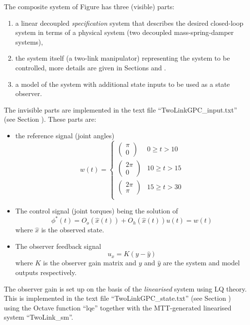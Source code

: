 The composite system of Figure  has three
(visible) parts:
\begin{enumerate}
\item a linear decoupled \emph{specification} system that describes the desired
  closed-loop system in terms of a physical system (two decoupled
  mass-spring-damper systems),
\item the system itself (a two-link manipulator) representing the
  system to be controlled, more details are given in Sections
   and .
\item a model of the system with additional state inputs to be used as
  a state observer.
\end{enumerate}
The invisible parts are implemented in the text file
``TwoLinkGPC\_input.txt'' (see Section ).
These parts are:
\begin{itemize}
\item the reference signal (joint angles)
  \begin{equation}
    w(t) = 
    \begin{cases}
      \begin{pmatrix}
        \pi \\
        0
      \end{pmatrix} & 0 \ge t > 10 \\
      \begin{pmatrix}
        2\pi \\
        0
      \end{pmatrix} & 10 \ge t > 15 \\
      \begin{pmatrix}
        2\pi \\
        \pi
      \end{pmatrix} & 15 \ge t > 30 \\
    \end{cases}
  \end{equation}
\item The control signal (joint torques) being the solution of 
  \begin{equation}
    \phi^*(t) = O_o(\hat x(t)) + O_h(\hat x(t)) u(t) = w(t)
  \end{equation}
where $\hat x$ is the observed state.
\item The observer feedback signal
  \begin{equation}
    u_x = K ( y - \hat y)
  \end{equation}
where $K$ is the observer gain matrix and $y$ and $\hat y$ are the
system and model outputs respectively.
\end{itemize}
The observer gain is set up on the basis of the \emph{linearised}
system using LQ theory. This is implemented in the text file
``TwoLinkGPC\_state.txt'' (see Section )
using the Octave function ``lqe'' together with the MTT-generated
linearised system ``TwoLink\_sm''.


